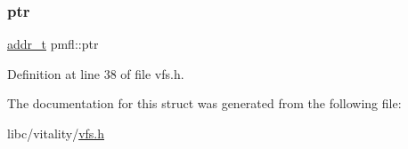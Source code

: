 \subsubsection{\texorpdfstring{ptr}{ptr}}
{\footnotesize\ttfamily \hyperlink{a00134_a295f71165288684c38c6bb836fbb3c59_a295f71165288684c38c6bb836fbb3c59}{addr\+\_\+t} pmfl\+::ptr}



Definition at line 38 of file vfs.\+h.



The documentation for this struct was generated from the following file\+:\begin{DoxyCompactItemize}
\item 
libc/vitality/\hyperlink{a00185}{vfs.\+h}\end{DoxyCompactItemize}
